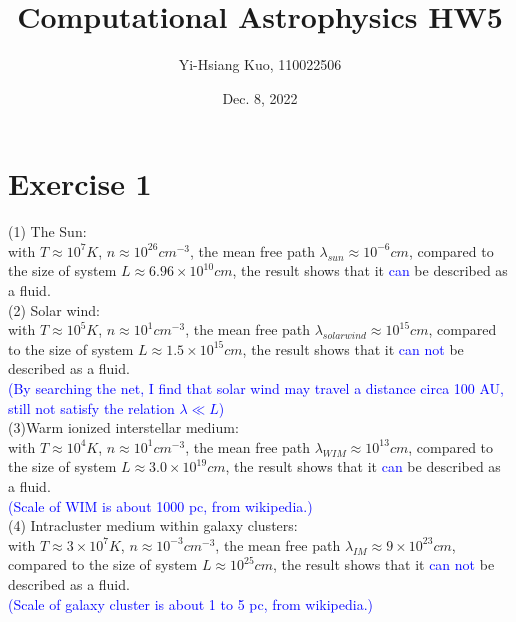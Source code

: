 \documentclass[aps,12pt,prd,nofootinbib,bibnotes, amsmath,amssymb,showpacs,superscriptaddress,floatfix]{revtex4-2}
\begin{document}
\title{Computational Astrophysics HW5}
\author{Yi-Hsiang Kuo, 110022506}
\date{Dec. 8, 2022}
\maketitle
\section{Exercise 1}
(1) The Sun: \\
with $T \approx 10^7 K$, $n \approx 10^{26} cm^{-3}$, the mean free path $\lambda_{sun} \approx 10^{-6} cm$, compared to the size of system $L \approx 6.96 \times 10^{10} cm$, the result shows that it \textcolor{blue}{can} be described as a fluid.\\ 

(2) Solar wind: \\
with $T \approx 10^5 K$, $n \approx 10^1 cm^{-3}$, the mean free path $\lambda_{solar wind} \approx 10^{15} cm$, compared to the size of system $L \approx 1.5 \times 10^{15} cm$, the result shows that it \textcolor{blue}{can not} be described as a fluid. \\
\textcolor{blue}{(By searching the net, I find that solar wind may travel a distance circa 100 AU, still not satisfy the relation $\lambda \ll L$)} \\

(3)Warm ionized interstellar medium: \\
with $T \approx 10^4 K$, $n \approx 10^1 cm^{-3}$, the mean free path $\lambda_{WIM} \approx 10^{13} cm$, compared to the size of system $L \approx 3.0 \times 10^{19} cm$, the result shows that it \textcolor{blue}{can} be described as a fluid. \\
\textcolor{blue}{(Scale of WIM is about 1000 pc, from wikipedia.)} \\

(4) Intracluster medium within galaxy clusters: \\
with $T \approx 3 \times 10^7 K$, $n \approx 10^{-3} cm^{-3}$, the mean free path $\lambda_{IM} \approx 9 \times 10^{23} cm$, compared to the size of system $L \approx 10^{25} cm$, the result shows that it \textcolor{blue}{can not} be described as a fluid. \\
\textcolor{blue}{(Scale of galaxy cluster is about 1 to 5 pc, from wikipedia.)} 
\end{document}

